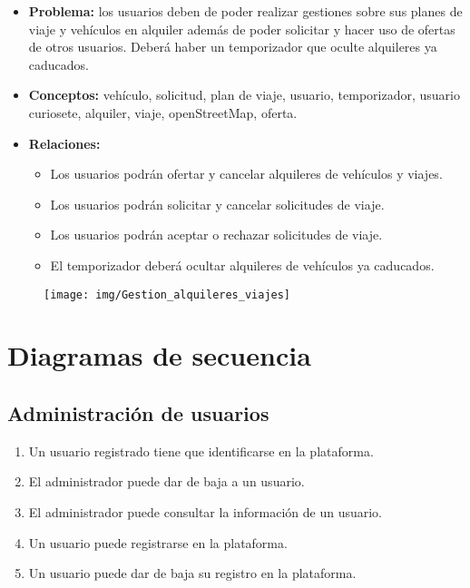 	\begin{itemize}
		\item \textbf{Problema: } los usuarios deben de poder realizar gestiones sobre sus planes de viaje y vehículos en alquiler además de poder solicitar y hacer uso de ofertas de otros usuarios. Deberá haber un temporizador que oculte alquileres ya caducados.
		
		\item \textbf{Conceptos: } vehículo, solicitud, plan de viaje, usuario, temporizador, usuario curiosete, alquiler, viaje, openStreetMap, oferta.
		
		\item \textbf{Relaciones: }
			
			\begin{itemize}
				\item Los usuarios podrán ofertar y cancelar alquileres de vehículos y viajes.
				\item Los usuarios podrán solicitar y cancelar solicitudes de viaje.
				\item Los usuarios podrán aceptar o rechazar solicitudes de viaje.
				\item El temporizador deberá ocultar alquileres de vehículos ya caducados.
			\end{itemize}
		\end{itemize}
	
	\begin{figure}[H]
		\centering
		\texttt{[image: img/Gestion\_alquileres\_viajes]}
		\label{fig:gestionalquileresviajes}
	\end{figure}

	
	
	\section{Diagramas de secuencia}
	
		\subsection{Administración de usuarios}
		
		\begin{enumerate}
			\item Un usuario registrado tiene que identificarse en la plataforma.
			\item El administrador puede dar de baja a un usuario.
			\item El administrador puede consultar la información de un usuario.
			\item Un usuario puede registrarse en la plataforma.
			\item Un usuario puede dar de baja su registro en la plataforma.
		\end{enumerate}
		
